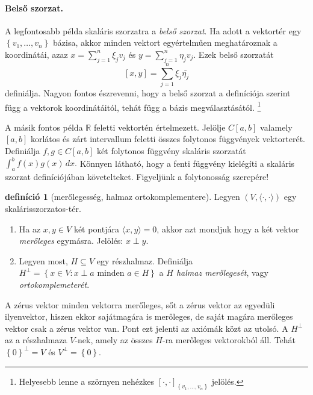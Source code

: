 \documentclass[9pt, a4paper, showtrims]{memoir}
\theoremstyle{plain}
\theoremstyle{remark}
\theoremstyle{definition}
\newtheorem{definition}[proposition]{definíció}
\newcommand{\ip}[2]{\langle#1,#2\rangle}
\begin{document}
\paragraph{Belső szorzat.} A legfontosabb példa skaláris szorzatra a \emph{belső szorzat}.
Ha adott a vektortér egy $\left\{ v_1,\ldots,v_n \right\}$ bázisa,
akkor minden vektort egyértelműen meghatároznak a koordinátái,
azaz
\begin{math}
	x=\sum_{j=1}^n\xi_jv_j
\end{math}
és
\begin{math}
	y=\sum_{j=1}^n\eta_jv_j.
\end{math}
Ezek belső szorzatát
\begin{displaymath}
	\left[ x,y \right]=\sum_{j=1}^n\xi_j\bar{\eta_j}
\end{displaymath}
definiálja.
Nagyon fontos észrevenni,
hogy a belső szorzat a definíciója szerint függ a vektorok koordinátáitól,
tehát függ a bázis megválasztásától.%
\footnote{
	Helyesebb lenne a szörnyen nehézkes
	$\left[ \cdot,\cdot \right]_{\left\{ v_1,\ldots,v_n \right\}}$ jelölés.
}

A másik fontos példa $\mathbb{R}$ feletti vektortén értelmezett.
Jelölje $C\left[ a,b \right]$ valamely $\left[ a,b \right]$ korlátos és zárt intervallum feletti összes folytonos függvények vektorterét.
Definiálja $f,g\in C\left[ a,b \right]$ két folytonos függvény skaláris szorzatát
\begin{math}
	\int_{a}^{b}f\left( x \right)g\left( x \right)\,dx.
\end{math}
Könnyen látható, hogy a fenti függvény kielégíti a skaláris szorzat definíciójában követelteket.
Figyeljünk a folytonosság szerepére!

\begin{definition}[merőlegesség, halmaz ortokomplementere]
	Legyen $\left( V,\ip{\cdot}{\cdot} \right)$ egy skalárisszorzatos-tér.
	\begin{enumerate}
		\item
		      Ha az $x,y\in V$ két pontjára $\ip{x}{y}=0$,
		      akkor azt mondjuk hogy a két vektor \emph{merőleges} egymásra.
		      Jelölés: $x\perp y$.
		\item
		      Legyen most, $H\subseteq V$ egy részhalmaz.
		      Definiálja
		      \(
		      H^{\perp}=\left\{ x\in V:x\perp a \text{ minden } a\in H \right\}
		      \)
		      a \emph{$H$ halmaz merőlegesét}, vagy \emph{ortokomplemeterét}.\qedhere
	\end{enumerate}
\end{definition}
A zérus vektor minden vektorra merőleges, sőt a zérus vektor az egyedüli ilyenvektor, hiszen ekkor sajátmagára is merőleges,
de saját magára merőleges vektor csak a zérus vektor van.
Pont ezt jelenti az axiómák közt az utolsó.
A $H^\perp$ az a részhalmaza $V$-nek, amely az összes $H$-ra merőleges vektorokból áll.
Tehát $\left\{ 0 \right\}^\perp = V$ és $V^{\perp}=\left\{ 0 \right\}$.
\end{document}
